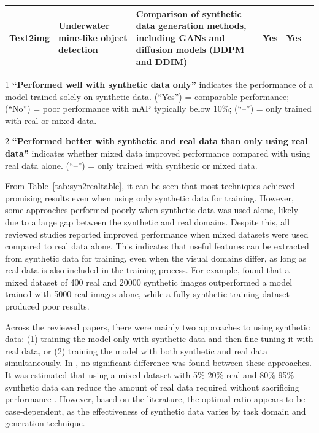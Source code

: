 \begin{table}[h!]
\begin{threeparttable}
\begin{tabular}{P{1.75cm}|P{2.5cm}|P{2.5cm}|P{1.85cm}|P{2.25cm}|P{1.25cm}}
    Text2img & Underwater mine-like object detection & Comparison of synthetic data generation methods, including GANs and diffusion models (DDPM and DDIM) & Yes & Yes & \cite{agrawal2024syn2realdomaingeneralizationunderwater} \\ \hline
    \end{tabular}
    \begin{tablenotes}
    \footnotesize
    \item[1] \textbf{“Performed well with synthetic data only”} indicates the performance of a model trained solely on synthetic data. (“Yes”) = comparable performance; (“No”) = poor performance with mAP typically below 10\%; (“–”) = only trained with real or mixed data. \\
    \item[2] \textbf{“Performed better with synthetic and real data than only using real data”} indicates whether mixed data improved performance compared with using real data alone. (“–”) = only trained with synthetic or mixed data. \\
    \end{tablenotes}

    \end{threeparttable}
\end{table}

From Table~\ref{tab:syn2realtable}, it can be seen that most techniques achieved promising results even when using only synthetic data for training. However, some approaches performed poorly when synthetic data was used alone, likely due to a large gap between the synthetic and real domains. Despite this, all reviewed studies reported improved performance when mixed datasets were used compared to real data alone. This indicates that useful features can be extracted from synthetic data for training, even when the visual domains differ, as long as real data is also included in the training process. For example, \cite{georgakis2017synthesizingtrainingdataobject} found that a mixed dataset of 400 real and 20000 synthetic images outperformed a model trained with 5000 real images alone, while a fully synthetic training dataset produced poor results.

Across the reviewed papers, there were mainly two approaches to using synthetic data: (1) training the model only with synthetic data and then fine-tuning it with real data, or (2) training the model with both synthetic and real data simultaneously. In \cite{burdorf2022reducingrealworlddata}, no significant difference was found between these approaches. It was estimated that using a mixed dataset with 5\%-20\% real and 80\%-95\% synthetic data can reduce the amount of real data required without sacrificing performance \cite{burdorf2022reducingrealworlddata}. However, based on the literature, the optimal ratio appears to be case-dependent, as the effectiveness of synthetic data varies by task domain and generation technique.

